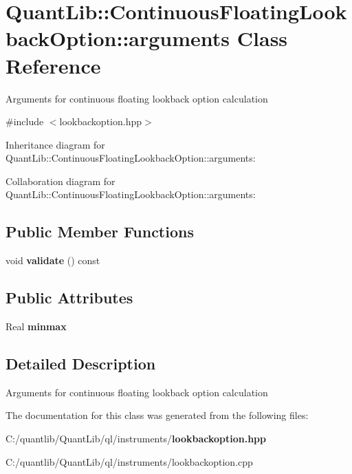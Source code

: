 \section{Quant\+Lib\+:\+:Continuous\+Floating\+Lookback\+Option\+:\+:arguments Class Reference}
\label{class_quant_lib_1_1_continuous_floating_lookback_option_1_1arguments}


Arguments for continuous floating lookback option calculation  




{\ttfamily \#include $<$lookbackoption.\+hpp$>$}



Inheritance diagram for Quant\+Lib\+:\+:Continuous\+Floating\+Lookback\+Option\+:\+:arguments\+:


Collaboration diagram for Quant\+Lib\+:\+:Continuous\+Floating\+Lookback\+Option\+:\+:arguments\+:
\subsection*{Public Member Functions}
\begin{DoxyCompactItemize}
\item 
void {\bfseries validate} () const \label{class_quant_lib_1_1_continuous_floating_lookback_option_1_1arguments_a9f3ae325676e1fc6844045a81603f069}

\end{DoxyCompactItemize}
\subsection*{Public Attributes}
\begin{DoxyCompactItemize}
\item 
Real {\bfseries minmax}\label{class_quant_lib_1_1_continuous_floating_lookback_option_1_1arguments_a41fa546a1337425641dd6972dcf3b363}

\end{DoxyCompactItemize}


\subsection{Detailed Description}
Arguments for continuous floating lookback option calculation 

The documentation for this class was generated from the following files\+:\begin{DoxyCompactItemize}
\item 
C\+:/quantlib/\+Quant\+Lib/ql/instruments/{\bf lookbackoption.\+hpp}\item 
C\+:/quantlib/\+Quant\+Lib/ql/instruments/lookbackoption.\+cpp\end{DoxyCompactItemize}
